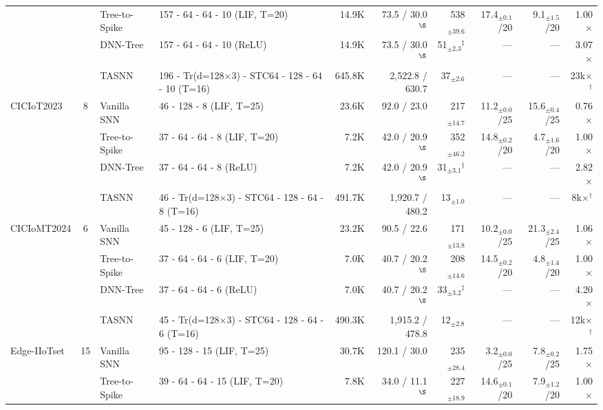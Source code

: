 \begin{table}[!ht]
{\begin{tabular}{l c l l r r r r r r}
& & Tree-to-Spike & 157 - 64 - 64 - 10 (LIF, T=20) & 14.9K & 73.5 / 30.0$^{\S}$ & 538$_{\pm39.6}$ & 17.4$_{\pm0.1}$/20 & 9.1$_{\pm1.5}$/20 & 1.00$\times$ \\
& & DNN-Tree      & 157 - 64 - 64 - 10 (ReLU) & 14.9K & 73.5 / 30.0$^{\S}$ & 51$_{\pm2.3}$$^\ddagger$ & --- & --- & 3.07$\times$ \\
& & TASNN         & 196 - Tr(d=128$\times$3) - STC64 - 128 - 64 - 10 (T=16) & 645.8K & 2,522.8 / 630.7 & 37$_{\pm2.6}$ & --- & --- & 23k$\times$$^\dagger$ \\
\midrule
\multirow{4}{*}{CICIoT2023} & \multirow{4}{*}{8}
  & Vanilla SNN   & 46 - 128 - 8 (LIF, T=25) & 23.6K & 92.0 / 23.0 & 217$_{\pm14.7}$ & 11.2$_{\pm0.0}$/25 & 15.6$_{\pm0.4}$/25 & 0.76$\times$ \\
& & Tree-to-Spike & 37 - 64 - 64 - 8 (LIF, T=20) & 7.2K & 42.0 / 20.9$^{\S}$ & 352$_{\pm46.2}$ & 14.8$_{\pm0.2}$/20 & 4.7$_{\pm1.6}$/20 & 1.00$\times$ \\
& & DNN-Tree      & 37 - 64 - 64 - 8 (ReLU) & 7.2K & 42.0 / 20.9$^{\S}$ & 31$_{\pm3.1}$$^\ddagger$ & --- & --- & 2.82$\times$ \\
& & TASNN         & 46 - Tr(d=128$\times$3) - STC64 - 128 - 64 - 8 (T=16) & 491.7K & 1,920.7 / 480.2 & 13$_{\pm1.0}$ & --- & --- & 8k$\times$$^\dagger$ \\
\midrule
\multirow{4}{*}{CICIoMT2024} & \multirow{4}{*}{6}
  & Vanilla SNN   & 45 - 128 - 6 (LIF, T=25) & 23.2K & 90.5 / 22.6 & 171$_{\pm13.8}$ & 10.2$_{\pm0.0}$/25 & 21.3$_{\pm2.4}$/25 & 1.06$\times$ \\
& & Tree-to-Spike & 37 - 64 - 64 - 6 (LIF, T=20) & 7.0K & 40.7 / 20.2$^{\S}$ & 208$_{\pm14.6}$ & 14.5$_{\pm0.2}$/20 & 4.8$_{\pm1.4}$/20 & 1.00$\times$ \\
& & DNN-Tree      & 37 - 64 - 64 - 6 (ReLU) & 7.0K & 40.7 / 20.2$^{\S}$ & 33$_{\pm3.2}$$^\ddagger$ & --- & --- & 4.20$\times$ \\
& & TASNN         & 45 - Tr(d=128$\times$3) - STC64 - 128 - 64 - 6 (T=16) & 490.3K & 1,915.2 / 478.8 & 12$_{\pm2.8}$ & --- & --- & 12k$\times$$^\dagger$ \\
\midrule
\multirow{4}{*}{Edge-IIoTset} & \multirow{4}{*}{15}
  & Vanilla SNN   & 95 - 128 - 15 (LIF, T=25) & 30.7K & 120.1 / 30.0 & 235$_{\pm28.4}$ & 3.2$_{\pm0.0}$/25 & 7.8$_{\pm0.2}$/25 & 1.75$\times$ \\
& & Tree-to-Spike & 39 - 64 - 64 - 15 (LIF, T=20) & 7.8K & 34.0 / 11.1$^{\S}$ & 227$_{\pm18.9}$ & 14.6$_{\pm0.1}$/20 & 7.9$_{\pm1.2}$/20 & 1.00$\times$ \\

\end{tabular}}
\end{table}
